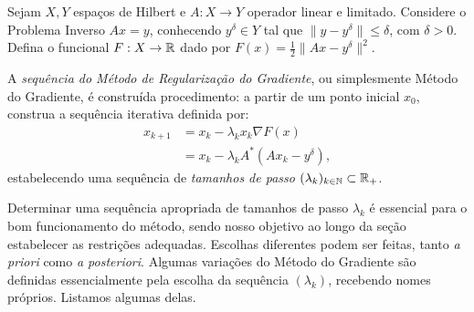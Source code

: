 \begin{defin}
\label{def:método-gradiente}
    Sejam $X,Y$ espaços de Hilbert e $A:X \to Y$ operador linear e limitado. Considere o Problema Inverso $Ax = y$, conhecendo $y^\delta \in Y$ tal que $\|y-y^\delta \|\leq \delta$, com $\delta>0$. Defina o funcional $F: X \to \mathbb{R}$ dado por $F(x) = \frac 1 2 \| Ax - y^\delta \|^2$.

    A \textit{sequência do Método de Regularização do Gradiente}, ou simplesmente Método do Gradiente, é construída procedimento: a partir de um ponto inicial $x_0$, construa a sequência iterativa definida por:
    \begin{align}
        x_{k+1} &= x_k - \lambda_k x_k \nabla F(x)\\
        &= x_k - \lambda_k A^*(Ax_k - y^\delta), \label{eq:metodo-gradiente}
    \end{align}
    estabelecendo uma sequência de \textit{tamanhos de passo} $(\lambda_k)_{k\in \mathbb N} \subset \mathbb{R}_+$. 
\end{defin}




Determinar uma sequência apropriada de tamanhos de passo $\lambda_k$ é essencial para o bom funcionamento do método, sendo nosso objetivo ao longo da seção estabelecer as restrições adequadas. Escolhas diferentes podem ser feitas, tanto \textit{a priori} como \textit{a posteriori}. Algumas variações do Método do Gradiente são definidas essencialmente pela escolha da sequência $(\lambda_k)$, recebendo nomes próprios. Listamos algumas delas.

